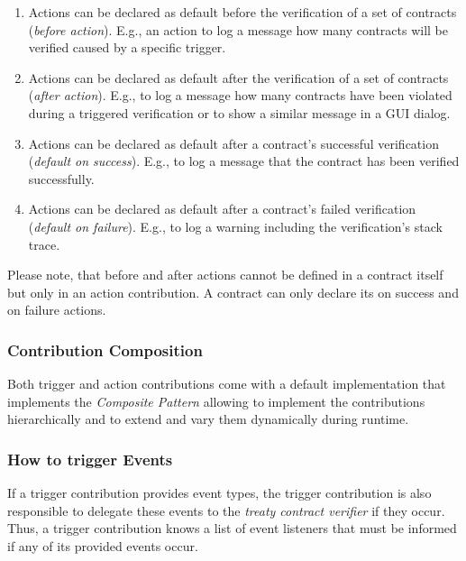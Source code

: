 \documentclass{llncs}
\begin{document}
\begin{enumerate}
	\item Actions can be declared as default before the verification of a set of contracts (\textit{before action}). E.g., an action to log a message how many contracts will be verified caused by a specific trigger.
	\item Actions can be declared as default after the verification of a set of contracts (\textit{after action}). E.g., to log a message how many contracts have been violated during a triggered verification or to show a similar message in a GUI dialog.
	\item Actions can be declared as default after a contract's successful verification (\textit{default on success}). E.g., to log a message that the contract has been verified successfully.
	\item Actions can be declared as default after a contract's failed verification (\textit{default on failure}). E.g., to log a warning including the verification's stack trace.
\end{enumerate}

Please note, that before and after actions cannot be defined in a contract itself but only in an action contribution. A contract can only declare its on success and on failure actions.

\subsubsection{Contribution Composition}

Both trigger and action contributions come with a default implementation that implements the \textit{Composite Pattern} \cite{GangOf4} allowing to implement the contributions hierarchically and to extend and vary them dynamically during runtime.

\subsubsection{How to trigger Events}

If a trigger contribution provides event types, the trigger contribution is also responsible to delegate these events to the \textit{treaty contract verifier} if they occur. Thus, a trigger contribution knows a list of event listeners that must be informed if any of its provided events occur. 
\end{document}
